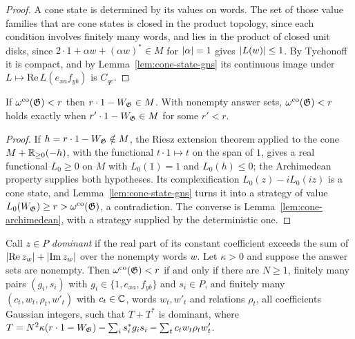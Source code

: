 \begin{proof}
\leanok
A cone state is determined by its values on words. The set of those value families that are
cone states is closed in the product topology, since each condition involves finitely many
words, and lies in the product of closed unit disks, since $2 \cdot 1 + \alpha w +
(\alpha w)^* \in M$ for $\left\vert {\alpha} \right\vert = 1$ gives $\left\vert {L(w)} \right\vert \leq 1$. By Tychonoff it is
compact, and by Lemma~\ref{lem:cone-state-gns} its continuous image under
$L \mapsto \mathrm{Re}\, L(e_{xa} f_{yb})$ is $C_{qc}$.
\end{proof}

\begin{theorem}
\label{thm:nc-positivstellensatz}
\leanok
If $\omega^{\mathrm{co}}(\mathfrak{G}) < r$ then $r \cdot 1 - W_{\mathfrak{G}} \in M$. With nonempty answer sets,
$\omega^{\mathrm{co}}(\mathfrak{G}) < r$ holds exactly when $r' \cdot 1 - W_{\mathfrak{G}} \in M$ for some $r' < r$.
\end{theorem}

\begin{proof}
\leanok
If $h = r \cdot 1 - W_{\mathfrak{G}} \notin M$, the Riesz extension theorem applied to the cone
$M + \mathbb{R}_{\geq 0}(-h)$, with the functional $t \cdot 1 \mapsto t$ on the span of $1$, gives a
real functional $L_0 \geq 0$ on $M$ with $L_0(1) = 1$ and $L_0(h) \leq 0$; the Archimedean
property supplies both hypotheses. Its complexification $L_0(z) - i L_0(iz)$ is a cone state,
and Lemma~\ref{lem:cone-state-gns} turns it into a strategy of value $L_0(W_{\mathfrak{G}}) \geq r >
\omega^{\mathrm{co}}(\mathfrak{G})$, a contradiction. The converse is Lemma~\ref{lem:cone-archimedean}, with a
strategy supplied by the deterministic one.
\end{proof}

\begin{lemma}
\label{lem:sos-certificates}
\leanok
Call $z \in P$ \emph{dominant} if the real part of its constant coefficient exceeds the sum of
$\left\vert {\mathrm{Re}\, z_w} \right\vert + \left\vert {\mathrm{Im}\, z_w} \right\vert$ over the nonempty words $w$. Let
$\kappa > 0$ and suppose the answer sets are nonempty. Then $\omega^{\mathrm{co}}(\mathfrak{G}) < r$ if and only
if there are $N \geq 1$, finitely many pairs $(g_i, s_i)$ with $g_i \in \{1, e_{xa},
f_{yb}\}$ and $s_i \in P$, and finitely many $(c_t, w_t, \rho_t, w'_t)$ with $c_t \in \mathbb{C}$,
words $w_t, w'_t$ and relations $\rho_t$, all coefficients Gaussian integers, such that
$T + T^*$ is dominant, where $T = N^2 \kappa (r \cdot 1 - W_{\mathfrak{G}}) - \sum_i s_i^* g_i s_i -
\sum_t c_t w_t \rho_t w'_t$.
\end{lemma}

